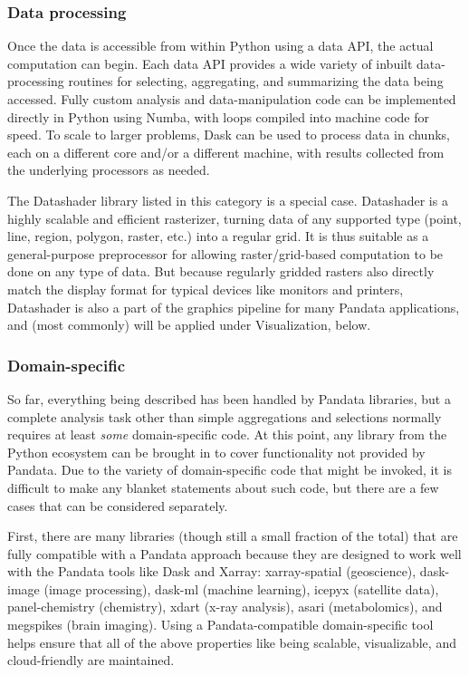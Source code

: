 \subsubsection{Data processing}

Once the data is accessible from within Python using a data API, the actual computation can begin. Each data API provides a wide variety of inbuilt data-processing routines for selecting, aggregating, and summarizing the data being accessed. Fully custom analysis and data-manipulation code can be implemented directly in Python using Numba, with loops compiled into machine code for speed. To scale to larger problems, Dask can be used to process data in chunks, each on a different core and/or a different machine, with results collected from the underlying processors as needed.

The Datashader library listed in this category is a special case. Datashader is a highly scalable and efficient rasterizer, turning data of any supported type (point, line, region, polygon, raster, etc.) into a regular grid. It is thus suitable as a general-purpose preprocessor for allowing raster/grid-based computation to be done on any type of data. But because regularly gridded rasters also directly match the display format for typical devices like monitors and printers, Datashader is also a part of the graphics pipeline for many Pandata applications, and (most commonly) will be applied under Visualization, below.


\subsubsection{Domain-specific}

So far, everything being described has been handled by Pandata libraries, but a complete analysis task other than simple aggregations and selections normally requires at least \emph{some} domain-specific code. At this point, any library from the Python ecosystem can be brought in to cover functionality not provided by Pandata. Due to the variety of domain-specific code that might be invoked, it is difficult to make any blanket statements about such code, but there are a few cases that can be considered separately.

First, there are many libraries (though still a small fraction of the total) that are fully compatible with a Pandata approach because they are designed to work well with the Pandata tools like Dask and Xarray: xarray-spatial (geoscience), dask-image (image processing), dask-ml (machine learning), icepyx (satellite data), panel-chemistry (chemistry), xdart (x-ray analysis), asari (metabolomics), and megspikes (brain imaging). Using a Pandata-compatible domain-specific tool helps ensure that all of the above properties like being scalable, visualizable, and cloud-friendly are maintained.

